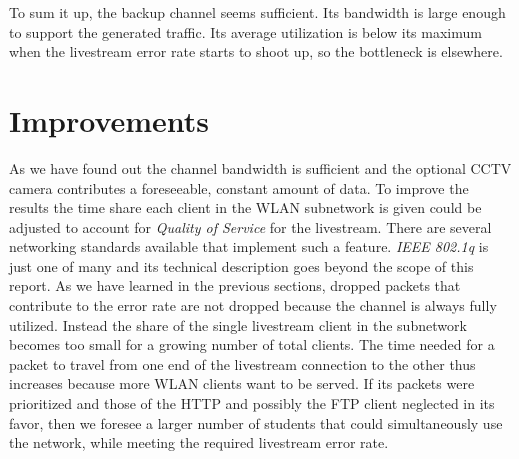 \documentclass[a4paper]{scrreprt}
\begin{document}
		 	To sum it up, the backup channel seems sufficient. Its bandwidth is large enough to support the generated traffic. Its average utilization is below its maximum when the livestream error rate starts to shoot up, so the bottleneck is elsewhere.
		 	
		 \section{Improvements}
		 	As we have found out the channel bandwidth is sufficient and the optional CCTV camera contributes a foreseeable, constant amount of data. To improve the results the time share each client in the WLAN subnetwork is given could be adjusted to account for \emph{Quality of Service} for the livestream. There are several networking standards available that implement such a feature. \emph{IEEE 802.1q} is just one of many and its technical description goes beyond the scope of this report. As we have learned in the previous sections, dropped packets that contribute to the error rate are not dropped because the channel is always fully utilized. Instead the share of the single livestream client in the subnetwork becomes too small for a growing number of total clients. The time needed for a packet to travel from one end of the livestream connection to the other thus increases because more WLAN clients want to be served. If its packets were prioritized and those of the HTTP and possibly the FTP client neglected in its favor, then we foresee a larger number of students that could simultaneously use the network, while meeting the required livestream error rate.
\end{document}

